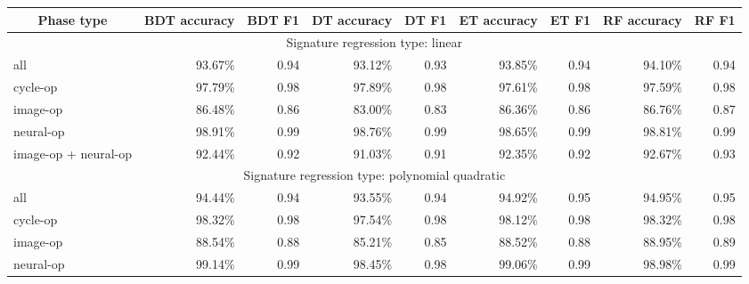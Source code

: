 \begin{table*}[htbp]
\begin{subtable}{\textwidth}
\begin{tabular}{@{}lrrrrrrrr@{}}
	        \bottomrule
		\end{tabular}
	\end{subtable}
    \vspace{1em}
	\begin{subtable}{\textwidth}
        \centering
        \caption{Model performance results for ini-cut segmentation, applied to each phase type}
        \label{tab:model_performance_ini}
        \begin{tabular}{@{}lrrrrrrrr@{}}
            \toprule
            \multicolumn{1}{c}{\textbf{Phase type}} & 
            \multicolumn{1}{c}{\textbf{BDT accuracy}} & 
            \multicolumn{1}{c}{\textbf{BDT F1}} & 
            \multicolumn{1}{c}{\textbf{DT accuracy}} &
            \multicolumn{1}{c}{\textbf{DT F1}} &
            \multicolumn{1}{c}{\textbf{ET accuracy}} &
            \multicolumn{1}{c}{\textbf{ET F1}} &
            \multicolumn{1}{c}{\textbf{RF accuracy}} &
            \multicolumn{1}{c}{\textbf{RF F1}} \\
            \midrule
            \multicolumn{9}{c}{Signature regression type: linear} \\
	        \midrule
            all               		& 93.67\%  & 0.94  & 93.12\%  & 0.93  & 93.85\%  & 0.94  & 94.10\%  & 0.94 \\
            cycle-op          		& 97.79\%  & 0.98  & 97.89\%  & 0.98  & 97.61\%  & 0.98  & 97.59\%  & 0.98 \\
            image-op          		& 86.48\%  & 0.86  & 83.00\%  & 0.83  & 86.36\%  & 0.86  & 86.76\%  & 0.87 \\
            neural-op         		& 98.91\%  & 0.99  & 98.76\%  & 0.99  & 98.65\%  & 0.99  & 98.81\%  & 0.99 \\
            image-op + neural-op 	& 92.44\%  & 0.92  & 91.03\%  & 0.91  & 92.35\%  & 0.92  & 92.67\%  & 0.93 \\
            \midrule
	        \multicolumn{9}{c}{Signature regression type: polynomial quadratic} \\
	        \midrule
	        all               		& 94.44\%  & 0.94  & 93.55\%  & 0.94  & 94.92\%  & 0.95  & 94.95\%  & 0.95 \\
            cycle-op          		& 98.32\%  & 0.98  & 97.54\%  & 0.98  & 98.12\%  & 0.98  & 98.32\%  & 0.98 \\
            image-op          		& 88.54\%  & 0.88  & 85.21\%  & 0.85  & 88.52\%  & 0.88  & 88.95\%  & 0.89 \\
            neural-op         		& 99.14\%  & 0.99  & 98.45\%  & 0.98  & 99.06\%  & 0.99  & 98.98\%  & 0.99 \\

\end{tabular}
\end{subtable}
\end{table*}
